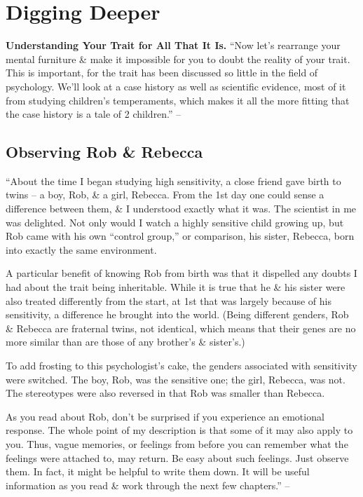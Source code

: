 \documentclass{article}
\numberwithin{equation}{section}
\begin{document}
\section{Digging Deeper}
\textbf{Understanding Your Trait for All That It Is.} ``Now let's rearrange your mental furniture \& make it impossible for you to doubt the reality of your trait. This is important, for the trait has been discussed so little in the field of psychology. We'll look at a case history as well as scientific evidence, most of it from studying children's temperaments, which makes it all the more fitting that the case history is a tale of 2 children.'' -- \cite[p. 57]{Aron2013}

\subsection{Observing Rob \& Rebecca}
``About the time I began studying high sensitivity, a close friend gave birth to twins -- a boy, Rob, \& a girl, Rebecca. From the 1st day one could sense a difference between them, \& I understood exactly what it was. The scientist in me was delighted. Not only would I watch a highly sensitive child growing up, but Rob came with his own ``control group,'' or comparison, his sister, Rebecca, born into exactly the same environment.

A particular benefit of knowing Rob from birth was that it dispelled any doubts I had about the trait being inheritable. While it is true that he \& his sister were also treated differently from the start, at 1st that was largely because of his sensitivity, a difference he brought into the world. (Being different genders, Rob \& Rebecca are fraternal twins, not identical, which means that their genes are no more similar than are those of any brother's \& sister's.)

To add frosting to this psychologist's cake, the genders associated with sensitivity were switched. The boy, Rob, was the sensitive one; the girl, Rebecca, was not. The stereotypes were also reversed in that Rob was smaller than Rebecca.

As you read about Rob, don't be surprised if you experience an emotional response. The whole point of my description is that some of it may also apply to you. Thus, vague memories, or feelings from before you can remember what the feelings were attached to, may return. Be easy about such feelings. Just observe them. In fact, it might be helpful to write them down. It will be useful information as you read \& work through the next few chapters.'' -- \cite[pp. 57--58]{Aron2013}
\end{document}

